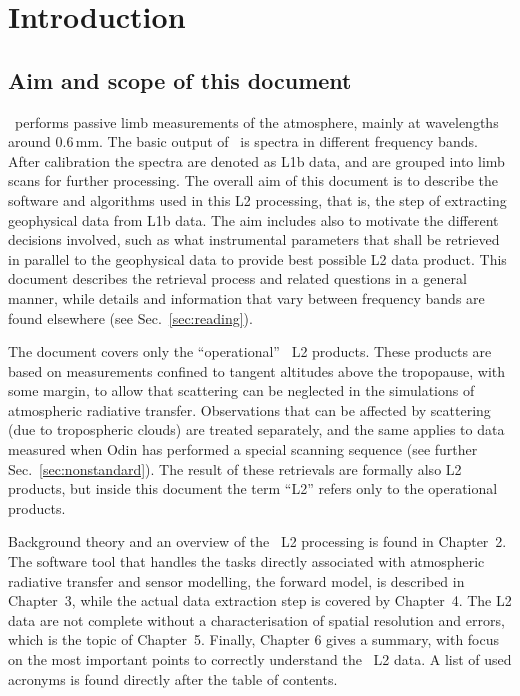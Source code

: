 \chapter{Introduction}
\label{chapter:introduction}

\setcounter{page}{1}


\section{Aim and scope of this document}
\label{sec:aim}
%
\smr\ performs passive limb measurements of the atmosphere, mainly at wavelengths
around 0.6\,mm. The basic output of \smr\ is spectra in different frequency
bands. After calibration the spectra are denoted as L1b data, and are grouped
into limb scans for further processing. The overall aim of this document is to
describe the software and algorithms used in this L2 processing, that is, the
step of extracting geophysical data from L1b data. The aim includes also to
motivate the different decisions involved, such as what instrumental parameters
that shall be retrieved in parallel to the geophysical data to provide best
possible L2 data product. This document describes the retrieval process and
related questions in a general manner, while details and information that
vary between frequency bands are found elsewhere (see
Sec.~\ref{sec:reading}).

The document covers only the ``operational'' \smr\ L2 products. These products
are based on measurements confined to tangent altitudes above the tropopause,
with some margin, to allow that scattering can be neglected in the simulations
of atmospheric radiative transfer. Observations that can be affected by
scattering (due to tropospheric clouds) are treated separately, and the same
applies to data measured when Odin has performed a special scanning
sequence (see further Sec.~\ref{sec:nonstandard}). The result of these
retrievals are formally also L2 products, but inside this document the term
``L2'' refers only to the operational products.

Background theory and an overview of the \smr\ L2 processing is found in
Chapter~2. The software tool that handles the tasks directly associated with
atmospheric radiative transfer and sensor modelling, the forward model, is
described in Chapter~3, while the actual data extraction step is covered by
Chapter~4. The L2 data are not complete without a characterisation of
spatial resolution and errors, which is the topic of Chapter~5. Finally,
Chapter 6 gives a summary, with focus on the most important points to correctly
understand the \smr\ L2 data. A list of used acronyms is found directly after
the table of contents.




